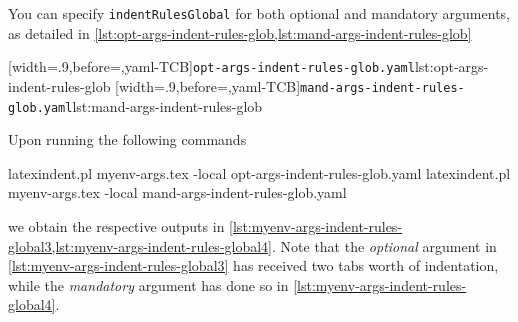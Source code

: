  \begin{example}
 You can specify \texttt{indentRulesGlobal} for both optional and mandatory arguments, as
 detailed in \cref{lst:opt-args-indent-rules-glob,lst:mand-args-indent-rules-glob}

 \begin{cmhtcbraster}
  [width=.9\linewidth,before=\centering,yaml-TCB]{\texttt{opt-args-indent-rules-glob.yaml}}{lst:opt-args-indent-rules-glob}
  [width=.9\linewidth,before=\centering,yaml-TCB]{\texttt{mand-args-indent-rules-glob.yaml}}{lst:mand-args-indent-rules-glob}
 \end{cmhtcbraster}

 Upon running the following commands 

 \begin{commandshell}
latexindent.pl myenv-args.tex -local opt-args-indent-rules-glob.yaml
latexindent.pl myenv-args.tex -local mand-args-indent-rules-glob.yaml
\end{commandshell}

 we obtain the respective outputs in
 \cref{lst:myenv-args-indent-rules-global3,lst:myenv-args-indent-rules-global4}. Note that
 the \emph{optional} argument in \cref{lst:myenv-args-indent-rules-global3} has received
 two tabs worth of indentation, while the \emph{mandatory} argument has done so in
 \cref{lst:myenv-args-indent-rules-global4}.

 \begin{widepage}
  \begin{minipage}{.55\textwidth}
  \end{minipage}
  \hfill
  \begin{minipage}{.55\textwidth}
  \end{minipage}
 \end{widepage}
 \end{example}
